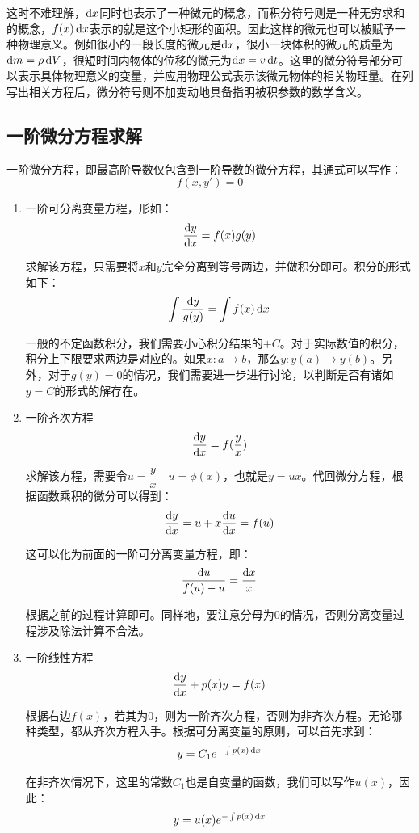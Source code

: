这时不难理解，$\dif{x}$同时也表示了一种微元的概念，而积分符号则是一种无穷求和的概念，$f(x)\dif{x}$表示的就是这个小矩形的面积。因此这样的微元也可以被赋予一种物理意义。例如很小的一段长度的微元是$\dif{x}$，很小一块体积的微元的质量为$\dif m = \rho \dif{V}$，很短时间内物体的位移的微元为$\dif{x} = v\dif{t}$。这里的微分符号部分可以表示具体物理意义的变量，并应用物理公式表示该微元物体的相关物理量。在列写出相关方程后，微分符号则不加变动地具备指明被积参数的数学含义。

\subsection[一阶微分方程求解]{一阶微分方程求解}
一阶微分方程，即最高阶导数仅包含到一阶导数的微分方程，其通式可以写作：
\[f(x,y') = 0\]

\begin{enumerate}
    \item 一阶可分离变量方程，形如：
    \[\dfrac{\dif y}{\dif x} = f(x)g(y)\]

    求解该方程，只需要将$x$和$y$完全分离到等号两边，并做积分即可。积分的形式如下：
    \[\int \dfrac{\dif y}{g(y)} = \int f(x)\dif x\]

    一般的不定函数积分，我们需要小心积分结果的$+C$。对于实际数值的积分，积分上下限要求两边是对应的。如果$x:a\rightarrow b$，那么$y:y(a)\rightarrow y(b)$。另外，对于$g(y) = 0$的情况，我们需要进一步进行讨论，以判断是否有诸如$y = C$的形式的解存在。

    \item 一阶齐次方程
    \[\dfrac{\dif y}{\dif x} = f(\dfrac{y}{x})\]

    求解该方程，需要令$u = \dfrac{y}{x}\quad u = \phi(x)$，也就是$y = ux$。代回微分方程，根据函数乘积的微分可以得到：
    \[\dfrac{\dif y}{\dif x} = u + x\dfrac{\dif u}{\dif x} = f(u)\]

    这可以化为前面的一阶可分离变量方程，即：
    \[\dfrac{\dif u}{f(u) - u} = \dfrac{\dif x}{x}\]

    根据之前的过程计算即可。同样地，要注意分母为0的情况，否则分离变量过程涉及除法计算不合法。

    \item 一阶线性方程
    \[\dfrac{\dif y}{\dif x} + p(x)y = f(x)\]

    根据右边$f(x)$，若其为0，则为一阶齐次方程，否则为非齐次方程。无论哪种类型，都从齐次方程入手。根据可分离变量的原则，可以首先求到：
    \[y = C_1 e^{-\int p(x)\dif x}\]

    在非齐次情况下，这里的常数$C_1$也是自变量的函数，我们可以写作$u(x)$，因此：
    \[y = u(x)e^{-\int p(x)\dif x}\]


\end{enumerate}
